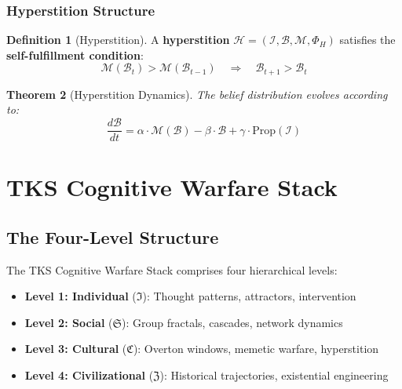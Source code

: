 \documentclass[11pt,twoside]{book}
\newcommand{\Hyperstition}{\mathcal{H}}
\newcommand{\Individual}{\mathfrak{I}}
\newcommand{\Social}{\mathfrak{S}}
\newcommand{\Cultural}{\mathfrak{C}}
\newcommand{\Civilizational}{\mathfrak{Z}}
\theoremstyle{definition}
\newtheorem{definition}{Definition}[chapter]
\theoremstyle{plain}
\newtheorem{theorem}[definition]{Theorem}
\theoremstyle{remark}
\begin{document}
\section{Hyperstition Structure}

\begin{definition}[Hyperstition]
A \textbf{hyperstition} $\Hyperstition = (\mathcal{I}, \mathcal{B}, \mathcal{M}, \Phi_H)$ satisfies the \textbf{self-fulfillment condition}:
\begin{equation}
\boxed{
\mathcal{M}(\mathcal{B}_t) > \mathcal{M}(\mathcal{B}_{t-1}) \quad \Rightarrow \quad \mathcal{B}_{t+1} > \mathcal{B}_t
}
\end{equation}
\end{definition}

\begin{theorem}[Hyperstition Dynamics]
The belief distribution evolves according to:
\begin{equation}
\boxed{
\frac{d\mathcal{B}}{dt} = \alpha \cdot \mathcal{M}(\mathcal{B}) - \beta \cdot \mathcal{B} + \gamma \cdot \mathrm{Prop}(\mathcal{I})
}
\end{equation}
\end{theorem}

\part{TKS Cognitive Warfare Stack}

\chapter{The Four-Level Structure}
\label{ch:four-level-structure}

\begin{tcolorbox}[colback=blue!5!white,colframe=blue!75!black,title=\textbf{Stack Architecture},breakable]
The TKS Cognitive Warfare Stack comprises four hierarchical levels:
\begin{itemize}
    \item \textbf{Level 1: Individual} ($\Individual$): Thought patterns, attractors, intervention
    \item \textbf{Level 2: Social} ($\Social$): Group fractals, cascades, network dynamics
    \item \textbf{Level 3: Cultural} ($\Cultural$): Overton windows, memetic warfare, hyperstition
    \item \textbf{Level 4: Civilizational} ($\Civilizational$): Historical trajectories, existential engineering
\end{itemize}
\end{tcolorbox}
\end{document}
